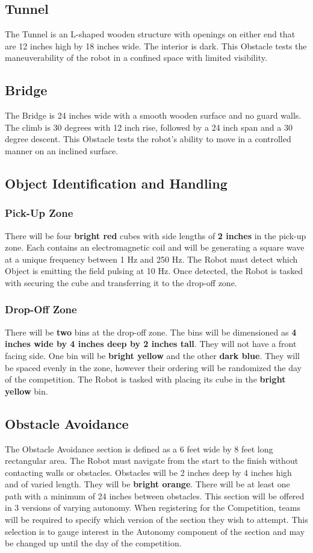 \subsection{Tunnel}
The Tunnel is an L-shaped wooden structure with openings on either end that are 12 inches high by 18 inches wide. The interior is dark. This Obstacle tests the maneuverability of the robot in a confined space with limited visibility.

\subsection{Bridge}
The Bridge is 24 inches wide with a smooth wooden surface and no guard walls. The climb is 30 degrees with 12 inch rise, followed by a 24 inch span and a 30 degree descent. This Obstacle tests the robot’s ability to move in a controlled manner on an inclined surface.

\subsection{Object Identification and Handling}
	\subsubsection{Pick-Up Zone}
		There will be four \textbf{bright red} cubes with side lengths of \textbf{2 inches} in the pick-up zone. Each contains an electromagnetic coil and will be generating a square wave at a unique frequency between 1 Hz and 250 Hz. The Robot must detect which Object is emitting the field pulsing at 10 Hz. Once detected, the Robot is tasked with securing the cube and transferring it to the drop-off zone.
	\subsubsection{Drop-Off Zone}
		There will be \textbf{two} bins at the drop-off zone. The bins will be dimensioned as \textbf{4 inches wide by 4 inches deep by 2 inches tall}. They will not have a front facing side. One bin will be \textbf{bright yellow} and the other \textbf{dark blue}. They will be spaced evenly in the zone, however their ordering will be randomized the day of the competition. The Robot is tasked with placing its cube in the \textbf{bright yellow} bin.

\subsection{Obstacle Avoidance}
The Obstacle Avoidance section is defined as a 6 feet wide by 8 feet long rectangular area. The Robot must navigate from the start to the finish without contacting walls or obstacles. Obstacles will be 2 inches deep by 4 inches high and of varied length. They will be \textbf{bright orange}. There will be at least one path with a minimum of 24 inches between obstacles. This section will be offered in 3 versions of varying autonomy. When registering for the Competition, teams will be required to specify which version of the section they wish to attempt. This selection is to gauge interest in the Autonomy component of the section and may be changed up until the day of the competition. 

